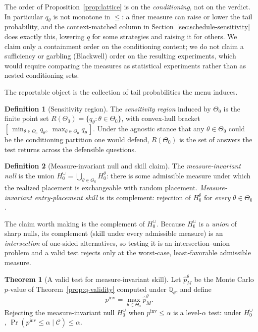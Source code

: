 \documentclass[preprint,12pt]{elsarticle}
\theoremstyle{definition}
\newtheorem{theorem}{Theorem}
\newtheorem{definition}{Definition}
\begin{document}
The order of Proposition~\ref{prop:lattice} is on the \emph{conditioning}, not on the verdict. In particular
$q_\theta$ is not monotone in $\le$: a finer measure can raise or lower the tail
probability, and the context-matched column in
Section~\ref{sec:schedule-sensitivity} does exactly this, lowering $q$ for some
strategies and raising it for others. We claim only a containment order on the
conditioning content; we do not claim a sufficiency or garbling (Blackwell) order
on the resulting experiments, which would require comparing the measures as
statistical experiments rather than as nested conditioning sets.

The reportable object is the collection of tail probabilities the menu induces.

\begin{definition}[Sensitivity region]
\label{def:id-region}
The \emph{sensitivity region} induced by $\Theta_0$ is the finite point set
$R(\Theta_0)=\{q_\theta:\theta\in\Theta_0\}$, with convex-hull bracket
$[\,\min_{\theta\in\Theta_0}q_\theta,\ \max_{\theta\in\Theta_0}q_\theta\,]$. Under
the agnostic stance that any $\theta\in\Theta_0$ could be the conditioning
partition one would defend, $R(\Theta_0)$ is the set of answers the test returns
across the defensible questions.
\end{definition}

\begin{definition}[Measure-invariant null and skill claim]
\label{def:invariant}
The \emph{measure-invariant null} is the union
$H_0^{\cup}=\bigcup_{\theta\in\Theta_0}H_0^\theta$: there is some admissible
measure under which the realized placement is exchangeable with random placement.
\emph{Measure-invariant entry-placement skill} is its complement: rejection of
$H_0^\theta$ for \emph{every} $\theta\in\Theta_0$.
\end{definition}

The claim worth making is the complement of $H_0^{\cup}$. Because $H_0^{\cup}$ is a
\emph{union} of sharp nulls, its complement (skill under every admissible measure)
is an \emph{intersection} of one-sided alternatives, so testing it is an
intersection--union problem and a valid test rejects only at the worst-case,
least-favorable admissible measure.

\begin{theorem}[A valid test for measure-invariant skill]
\label{prop:iut}
Let $\hat p_M^\theta$ be the Monte Carlo $p$-value of
Theorem~\ref{prop:q-validity} computed under $\mathbb{Q}_\theta$, and define
\[
p^{\mathrm{inv}}=\max_{\theta\in\Theta_0}\hat p_M^\theta .
\]
Rejecting the measure-invariant null $H_0^{\cup}$ when
$p^{\mathrm{inv}}\le\alpha$ is a level-$\alpha$ test: under $H_0^{\cup}$,
$\Pr(p^{\mathrm{inv}}\le\alpha\mid\mathcal C)\le\alpha$.
\end{theorem}
\end{document}
